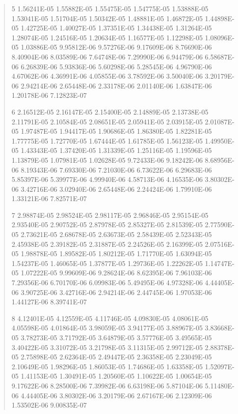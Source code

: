 \documentclass[letterpaper,10pt,english]{sphinxmanual}
\begin{document}
\begin{quote}
\begin{DUlineblock}{0em}
\begin{DUlineblock}{\DUlineblockindent}
\item[] 5   1.56241E-05  1.55882E-05  1.55475E-05  1.54775E-05  1.53888E-05  1.53041E-05  1.51704E-05  1.50342E-05  1.48881E-05  1.46872E-05  1.44898E-05  1.42725E-05  1.40027E-05  1.37351E-05  1.34438E-05  1.31264E-05  1.28074E-05  1.24516E-05  1.20634E-05  1.16577E-05  1.12298E-05  1.08096E-05  1.03886E-05  9.95812E-06  9.57276E-06  9.17609E-06  8.76690E-06  8.40904E-06  8.03589E-06  7.64748E-06  7.29990E-06  6.94479E-06  6.58687E-06  6.26839E-06  5.93836E-06  5.60298E-06  5.28545E-06  4.96790E-06  4.67062E-06  4.36991E-06  4.05855E-06  3.78592E-06  3.50040E-06  3.20179E-06  2.94214E-06  2.65448E-06  2.33178E-06  2.01140E-06  1.63847E-06  1.20178E-06  7.12823E-07
\item[] 6   2.16512E-05  2.16147E-05  2.15400E-05  2.14889E-05  2.13738E-05  2.11791E-05  2.10584E-05  2.08651E-05  2.05941E-05  2.03915E-05  2.01087E-05  1.97487E-05  1.94417E-05  1.90686E-05  1.86380E-05  1.82281E-05  1.77775E-05  1.72770E-05  1.67444E-05  1.61785E-05  1.56123E-05  1.49950E-05  1.43343E-05  1.37420E-05  1.31339E-05  1.25116E-05  1.19596E-05  1.13879E-05  1.07981E-05  1.02628E-05  9.72433E-06  9.18242E-06  8.68956E-06  8.19343E-06  7.69330E-06  7.21030E-06  6.73622E-06  6.29683E-06  5.85397E-06  5.39977E-06  4.99940E-06  4.58713E-06  4.16535E-06  3.80302E-06  3.42716E-06  3.02940E-06  2.65448E-06  2.24424E-06  1.79910E-06  1.33121E-06  7.82571E-07
\item[] 7   2.98874E-05  2.98524E-05  2.98117E-05  2.96846E-05  2.95154E-05  2.93540E-05  2.90752E-05  2.87978E-05  2.85327E-05  2.81539E-05  2.77590E-05  2.73621E-05  2.68678E-05  2.63673E-05  2.58439E-05  2.52343E-05  2.45938E-05  2.39182E-05  2.31887E-05  2.24526E-05  2.16399E-05  2.07516E-05  1.98878E-05  1.89582E-05  1.80212E-05  1.71770E-05  1.63094E-05  1.54237E-05  1.46065E-05  1.37877E-05  1.29736E-05  1.22262E-05  1.14747E-05  1.07222E-05  9.99609E-06  9.28624E-06  8.62395E-06  7.96103E-06  7.29356E-06  6.70170E-06  6.09983E-06  5.49495E-06  4.97328E-06  4.44405E-06  3.90725E-06  3.42716E-06  2.94214E-06  2.44745E-06  1.97053E-06  1.44127E-06  8.39741E-07
\item[] 8   4.12401E-05  4.12559E-05  4.11746E-05  4.09830E-05  4.08061E-05  4.05598E-05  4.01864E-05  3.98059E-05  3.94177E-05  3.88967E-05  3.83668E-05  3.78273E-05  3.71792E-05  3.64879E-05  3.57776E-05  3.49565E-05  3.40422E-05  3.31072E-05  3.21798E-05  3.11315E-05  2.99712E-05  2.88378E-05  2.75898E-05  2.62364E-05  2.49447E-05  2.36358E-05  2.23049E-05  2.10649E-05  1.98296E-05  1.86053E-05  1.74686E-05  1.63358E-05  1.52097E-05  1.41153E-05  1.30491E-05  1.20560E-05  1.10622E-05  1.00654E-05  9.17622E-06  8.28500E-06  7.39982E-06  6.63198E-06  5.87104E-06  5.11480E-06  4.44405E-06  3.80302E-06  3.20179E-06  2.67167E-06  2.12309E-06  1.53502E-06  9.00835E-07

\end{DUlineblock}
\end{DUlineblock}
\end{quote}
\end{document}
